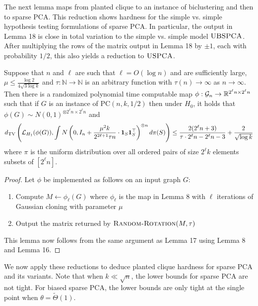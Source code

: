\documentclass[11pt]{article}
\begin{document}
The next lemma maps from planted clique to an instance of biclustering and then to sparse PCA. This reduction shows hardness for the simple vs. simple hypothesis testing formulations of sparse PCA. In particular, the output in Lemma 18 is close in total variation to the simple vs. simple model $\textsc{UBSPCA}$. After multiplying the rows of the matrix output in Lemma 18 by $\pm 1$, each with probability $1/2$, this also yields a reduction to $\textsc{USPCA}$.

\begin{lemma}
Suppose that $n$ and $\ell$ are such that $\ell = O(\log n)$ and are sufficiently large, $\mu \le \frac{\log 2}{4 \sqrt{3 \log k}}$ and $\tau : \mathbb{N} \to \mathbb{N}$ is an arbitrary function with $\tau(n) \to \infty$ as $n \to \infty$. Then there is a randomized polynomial time computable map $\phi : \mathcal{G}_n \to \mathbb{R}^{2^\ell n \times 2^\ell n}$ such that if $G$ is an instance of $\text{PC}(n, k, 1/2)$ then under $H_0$, it holds that $\phi(G) \sim N(0, 1)^{\otimes 2^\ell n \times 2^\ell n}$ and
$$d_{\text{TV}}\left( \mathcal{L}_{H_1}(\phi(G)), \int N\left(0, I_n + \frac{\mu^2 k}{2^{2\ell + 1} \tau n} \cdot \mathbf{1}_S \mathbf{1}_S^\top\right)^{\otimes n} d\pi(S) \right) \le \frac{2(2^\ell n + 3)}{\tau \cdot 2^\ell n - 2^\ell n - 3} + \frac{2}{\sqrt{\log k}}$$
where $\pi$ is the uniform distribution over all ordered pairs of size $2^\ell k$ elements subsets of $[2^\ell n]$.
\end{lemma}

\begin{proof}
Let $\phi$ be implemented as follows on an input graph $G$:
\begin{enumerate}
\item Compute $M \gets \phi_\ell(G)$ where $\phi_\ell$ is the map in Lemma 8 with $\ell$ iterations of Gaussian cloning with parameter $\mu$
\item Output the matrix returned by $\textsc{Random-Rotation}(M, \tau)$
\end{enumerate}
This lemma now follows from the same argument as Lemma 17 using Lemma 8 and Lemma 16.
\end{proof}

We now apply these reductions to deduce planted clique hardness for sparse PCA and its variants. Note that when $k \ll \sqrt{n}$, the lower bounds for sparse PCA are not tight. For biased sparse PCA, the lower bounds are only tight at the single point when $\theta = \tilde{\Theta}(1)$. 
\end{document}
